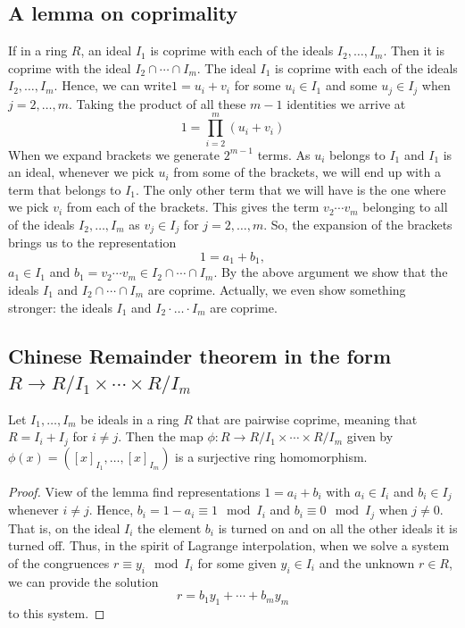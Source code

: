 \documentclass[11pt,a4paper]{amsart}
\begin{document}
\subsection{A lemma on coprimality} If in a ring $R$, an ideal $I_1$ is coprime with each of the ideals $I_2,\ldots,I_m$. Then it is coprime with the ideal $I_2 \cap \cdots \cap I_m$. 
The ideal $I_1$ is coprime with each of the ideals $I_2,\ldots,I_m$. Hence, we can 
write$1 = u_i + v_i$ for some $u_i \in I_1$ and some $u_j \in I_j$ when $j=2,\ldots,m$. Taking the product of all these $m-1$ identities we arrive at 
\[
1 = \prod_{i=2}^m (u_i + v_i) 
\]
When we expand brackets we generate $2^{m-1}$ terms. As $u_i$ belongs to $I_1$ and $I_1$ is an ideal, whenever we pick $u_i$ from some of the brackets, we will end up with a term that belongs to $I_1$. The only other term that we will have is the one where we pick $v_i$ from each of the brackets. This gives the term $v_2 \cdots v_m$ belonging to all of the ideals $I_2, \ldots, I_m$ as $v_j \in I_j$ for $j = 2,\ldots,m$. So, the expansion of the brackets brings us to the representation 
\[
1 = a_1 + b_1,
\]
$a_1 \in I_1$ and $b_ 1= v_2 \cdots v_m \in I_2 \cap \cdots \cap I_m$. By the above argument we show that the ideals $I_1$ and $I_2 \cap \cdots \cap I_m$ are coprime. Actually, we even show something stronger: the ideals $I_1$ and $I_2 \cdot \ldots \cdot I_m$ are coprime. 


\subsection{Chinese Remainder theorem in the form $R \to R / I_1 \times \cdots \times R / I_m$} Let $I_1,\ldots,I_m$ be ideals in a ring $R$ that are pairwise coprime, meaning that $R = I_i + I_j$ for $i \ne j$. Then the map $\phi : R \to R / I_1 \times \cdots \times R / I_m $ given by $\phi(x) = ([x]_{I_1} , \ldots, [x]_{I_m})$ is a surjective ring homomorphism. 

\begin{proof} View of the lemma find representations $1 = a_i + b_i$ with $a_i \in I_i$ and $b_i \in I_j$ whenever $i \ne j$. Hence, $b_i =  1 - a_i \equiv 1 \mod I_i$ and $b_i \equiv 0 \mod I_j$ when $j \ne 0$. That is, on the ideal $I_i$ the element $b_i$ is turned on and on all the other ideals it is turned off. Thus, in the spirit of Lagrange interpolation, when we 
solve a system of the congruences $r \equiv y_i \mod I_i$ for some given $y_i \in I_i$ and the unknown $r \in R$, we can provide the solution 
\[
	r = b_1 y_1 + \cdots + b_m y_m
\]
to this system. 

\end{proof} 
\end{document}

